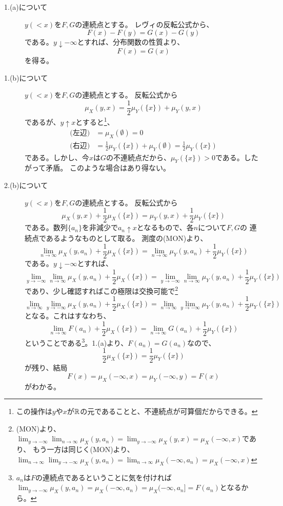     \begin{description}
      \item[1.(a)について]
        $y ( < x )$を$F,G$の連続点とする。
        レヴィの反転公式から、
        \[
          F(x) - F(y) = G(x) - G(y)
        \]
        である。$y \downarrow -\infty$とすれば、分布関数の性質より、
        \[
          F(x) = G(x)
        \]
        を得る。
      \item[1.(b)について]
        $y ( < x )$を$F,G$の連続点とする。
        反転公式から
        \[
          \mu_X (y,x) = \frac{1}{2}\mu_Y(\{x\}) + \mu_Y(y,x)
        \]
        であるが、$y \uparrow x$とすると\footnote{この操作は$y$や$x$が${\mathbb{R}}$の元であることと、不連続点が可算個だからできる。}、
        \begin{align*}
          \text{(左辺)} &= \mu_X(\emptyset) = 0\\
          \text{(右辺)} &= \frac{1}{2}\mu_Y(\{x\}) + \mu_Y(\emptyset) = \frac{1}{2}\mu_Y(\{x\})
        \end{align*}
        である。しかし、今$x$は$G$の不連続点だから、$\mu_Y(\{x\}) > 0$である。したがって矛盾。
        このような場合はあり得ない。
      \item[2.(b)について]
        $y ( < x )$を$F,G$の連続点とする。
        反転公式から
        \[
          \mu_X(y,x) + \frac{1}{2}\mu_X(\{x\}) = \mu_Y(y,x) + \frac{1}{2}\mu_Y(\{x\})
        \]
        である。数列$\{a_n\}$を非減少で$a_n \uparrow x$となるもので、各$n$について$F,G$の
        連続点であるようなものとして取る。
        測度の(MON)より、
        \[
          \lim_{n \to \infty}\mu_X(y,a_n) + \frac{1}{2}\mu_X(\{x\}) = \lim_{n \to \infty}\mu_Y(y,a_n) + \frac{1}{2}\mu_Y(\{x\})
        \]
        である。$y \downarrow -\infty$とすれば、
        \[
          \lim_{y \to -\infty}\lim_{n \to \infty}\mu_X(y,a_n) + \frac{1}{2}\mu_X(\{x\}) = \lim_{y \to -\infty}\lim_{n \to \infty}\mu_Y(y,a_n) + \frac{1}{2}\mu_Y(\{x\})
        \]
        であり、少し確認すればこの極限は交換可能で\footnote{(MON)より、
        $\lim_{y \to -\infty}\lim_{n \to \infty}\mu_X(y,a_n) = \lim_{y \to -\infty}\mu_X(y,x) = \mu_X(-\infty, x)$であり、
        もう一方は同じく(MON)より、
        $\lim_{n \to \infty}\lim_{y \to -\infty}\mu_X(y,a_n) = \lim_{n \to \infty}\mu_X(-\infty, a_n) = \mu_X(-\infty, x)$
        }
        \[
          \lim_{n \to \infty}\lim_{y \to -\infty}\mu_X(y,a_n) + \frac{1}{2}\mu_X(\{x\}) = \lim_{n \to \infty}\lim_{y \to -\infty}\mu_Y(y,a_n) + \frac{1}{2}\mu_Y(\{x\})
        \]
        となる。これはすなわち、
        \[
          \lim_{n \to \infty}F(a_n) + \frac{1}{2}\mu_X(\{x\}) = \lim_{n \to \infty}G(a_n) + \frac{1}{2}\mu_Y(\{x\})
        \]
        ということである\footnote{$a_n$は$F$の連続点であるということに気を付ければ$\lim_{y \to -\infty}\mu_X(y,a_n) = \mu_X(-\infty, a_n) = \mu_X(-\infty, a_n] = F(a_n)$となるから。}。1.(a)より、$F(a_n) = G(a_n)$なので、
        \[
          \frac{1}{2}\mu_X(\{x\}) = \frac{1}{2}\mu_Y(\{x\})
        \]
        が残り、結局
        \[
          F(x) = \mu_X(-\infty, x) = \mu_Y(-\infty, y) =F(x)
        \]
        がわかる。
    \end{description}

